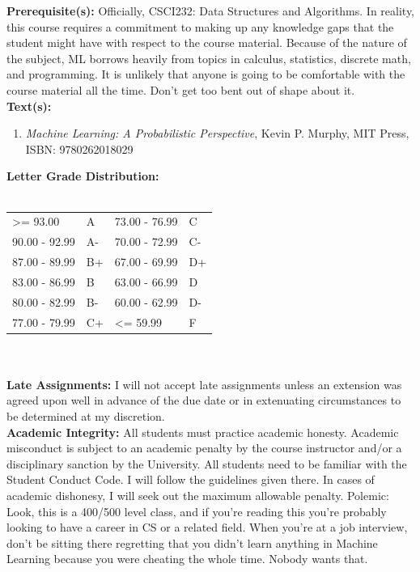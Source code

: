 \documentclass[11pt]{article}
\begin{document}
\textbf{\large Prerequisite(s):} Officially, CSCI232: Data Structures and Algorithms.  In reality, this course requires a commitment to making up any knowledge gaps that the student might have with respect to the course material.  Because of the nature of the subject, ML borrows heavily from topics in calculus, statistics, discrete math, and programming.  It is unlikely that anyone is going to be comfortable with the course material all the time.  Don't get too bent out of shape about it.  
\vspace{5mm} \\
\textbf {\large Text(s):} \begin{enumerate} \item \emph{Machine Learning: A Probabilistic Perspective}, Kevin P. Murphy, MIT Press, ISBN: 9780262018029 
\end{enumerate} \vspace{5mm}
\textbf {\large Letter Grade Distribution:} \\\\
\hspace*{40mm}
\begin{tabular}{ l l | l l }
\textgreater= 93.00 & A & 73.00 - 76.99 & C \\
90.00 - 92.99 & A-  & 70.00 - 72.99 & C- \\
87.00 - 89.99 & B+  & 67.00 - 69.99 & D+ \\
83.00 - 86.99 & B  & 63.00 - 66.99 & D \\
80.00 - 82.99 & B-  & 60.00 - 62.99 & D- \\
77.00 - 79.99 & C+  & \textless= 59.99 & F \\
\end{tabular} \\
\vspace{5mm} \\
\textbf{\large Late Assignments:}
I will not accept late assignments unless an extension was agreed upon well in advance of the due date or in extenuating circumstances to be determined at my discretion. \vspace{5mm} \\
\textbf{\large Academic Integrity:}
All students must practice academic honesty. Academic misconduct is subject to an academic penalty by the course instructor and/or a disciplinary sanction by the University. All students need to be familiar with the Student Conduct Code. I will follow the guidelines given there. In cases of academic dishonesy, I will seek out the maximum allowable penalty.  Polemic:  Look, this is a 400/500 level class, and if you're reading this you're probably looking to have a career in CS or a related field.  When you're at a job interview, don't be sitting there regretting that you didn't learn anything in Machine Learning because you were cheating the whole time.  Nobody wants that.  \vspace{5mm} \\
\end{document}
